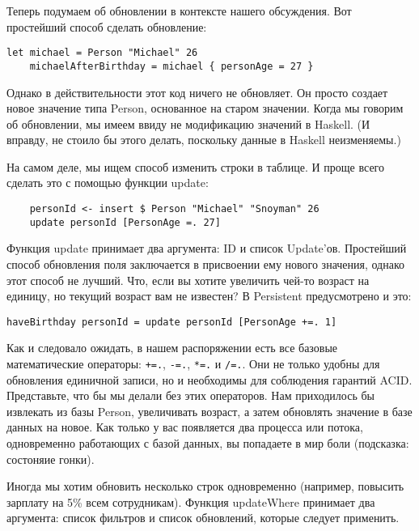 Теперь подумаем об обновлении в контексте нашего обсуждения. Вот простейший способ сделать обновление:

\begin{lstlisting}
let michael = Person "Michael" 26
    michaelAfterBirthday = michael { personAge = 27 }
\end{lstlisting}

Однако в действительности этот код ничего не обновляет. Он просто создает новое значение типа Person, основанное на старом значении. Когда мы говорим об обновлении, мы имеем ввиду не модификацию значений в Haskell. (И вправду, не стоило бы этого делать, поскольку данные в Haskell неизменяемы.) %

На самом деле, мы ищем способ изменить строки в таблице. И проще всего сделать это с помощью функции update:

\begin{lstlisting}
    personId <- insert $ Person "Michael" "Snoyman" 26
    update personId [PersonAge =. 27]
\end{lstlisting}%

Функция update принимает два аргумента: ID и список Update'ов. Простейший способ обновления поля заключается в присвоении ему нового значения, однако этот способ не лучший. Что, если вы хотите увеличить чей-то возраст на единицу, но текущий возраст вам не известен? В Persistent предусмотрено и это:

\begin{lstlisting}
haveBirthday personId = update personId [PersonAge +=. 1]
\end{lstlisting}%

Как и следовало ожидать, в нашем распоряжении есть все базовые математические операторы: \lstinline'+=.', \lstinline'-=.', \lstinline'*=.' и \lstinline'/=.'. Они не только удобны для обновления единичной записи, но и необходимы для соблюдения гарантий ACID. Представьте, что бы мы делали без этих операторов. Нам приходилось бы извлекать из базы Person, увеличивать возраст, а затем обновлять значение в базе данных на новое. Как только у вас появляется два процесса или потока, одновременно работающих с базой данных, вы попадаете в мир боли (подсказка: состоняие гонки).

Иногда мы хотим обновить несколько строк одновременно (например, повысить зарплату на 5\% всем сотрудникам). Функция updateWhere принимает два аргумента: список фильтров и список обновлений, которые следует применить. %

